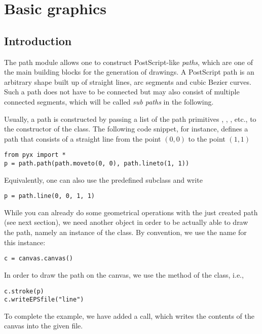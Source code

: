 \chapter{Basic graphics}


\label{path}

\section{Introduction}

The path module allows one to construct PostScript-like
\textit{paths}, which are one of the main building blocks for the
generation of drawings. A PostScript path is an arbitrary shape built
up of straight lines, arc segments and cubic Bezier curves. Such a
path does not have to be connected but may also consist of multiple
connected segments, which will be called \textit{sub paths} in the
following.

Usually, a path is constructed by passing a list of the path
primitives , , , etc., to the
constructor of the  class. The following code snippet, for
instance, defines a path  that consists of a straight line
from the point $(0, 0)$ to the point $(1, 1)$
\begin{verbatim}
from pyx import *
p = path.path(path.moveto(0, 0), path.lineto(1, 1))
\end{verbatim}
Equivalently, one can also use the predefined  subclass
 and write
\begin{verbatim}
p = path.line(0, 0, 1, 1)
\end{verbatim}

While you can already do some geometrical operations with the
just created path (see next section), we need another \PyX{} object
in order to be actually able to draw the path, namely
an instance of the  class. By convention, we use
the name  for this instance:
\begin{verbatim}
c = canvas.canvas()
\end{verbatim}
In order to draw the path on the canvas, we use the  method
of the  class, i.e.,
\begin{verbatim}
c.stroke(p)
c.writeEPSfile("line")
\end{verbatim}
To complete the example, we have added a  call,
which writes the contents of the canvas into the given file.

